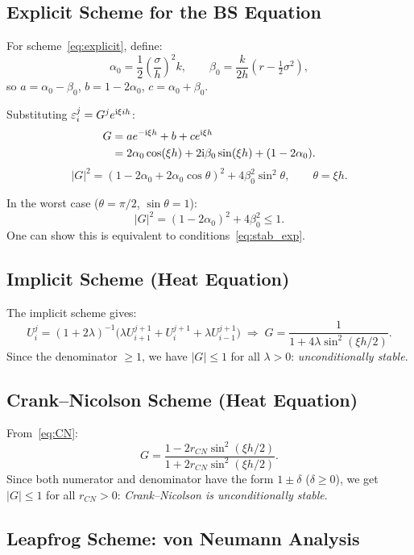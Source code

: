 \documentclass[12pt,a4paper]{article}
\theoremstyle{plain}
\theoremstyle{definition}
\theoremstyle{remark}
\begin{document}
\subsection{Explicit Scheme for the BS Equation}

For scheme~\eqref{eq:explicit}, define:
\[
  \alpha_{0}=\frac{1}{2}\!\left(\frac{\sigma}{h}\right)^{2}k,
  \qquad
  \beta_{0}=\frac{k}{2h}\!\left(r-\tfrac{1}{2}\sigma^{2}\right),
\]
so $a=\alpha_{0}-\beta_{0}$, $b=1-2\alpha_{0}$, $c=\alpha_{0}+\beta_{0}$.

Substituting $\varepsilon_{i}^{j}=G^{j}e^{{\rm i}\xi ih}$:
\begin{align*}
  G &= ae^{-{\rm i}\xi h}+b+ce^{{\rm i}\xi h}\\
    &= 2\alpha_{0}\cos(\xi h)+2{\rm i}\beta_{0}\sin(\xi h)+(1-2\alpha_{0}).
\end{align*}
\[
  |G|^{2}=\left(1-2\alpha_{0}+2\alpha_{0}\cos\theta\right)^{2}
           +4\beta_{0}^{2}\sin^{2}\theta,
  \qquad\theta=\xi h.
\]

In the worst case ($\theta=\pi/2$, $\sin\theta=1$):
\[
  |G|^{2}=(1-2\alpha_{0})^{2}+4\beta_{0}^{2}\leq1.
\]
One can show this is equivalent to conditions~\eqref{eq:stab_exp}.

\subsection{Implicit Scheme (Heat Equation)}

The implicit scheme gives:
\[
  U_{i}^{j}=(1+2\lambda)^{-1}
  \bigl(\lambda U_{i+1}^{j+1}+U_{i}^{j+1}+\lambda U_{i-1}^{j+1}\bigr)
  \;\Longrightarrow\;
  G=\frac{1}{1+4\lambda\sin^{2}(\xi h/2)}.
\]
Since the denominator $\geq1$, we have $|G|\leq1$ for all $\lambda>0$:
\emph{unconditionally stable}.

\subsection{Crank--Nicolson Scheme (Heat Equation)}

From~\eqref{eq:CN}:
\begin{equation}\label{eq:G_CN}
  G=\frac{1-2r_{CN}\sin^{2}(\xi h/2)}{1+2r_{CN}\sin^{2}(\xi h/2)}.
\end{equation}
Since both numerator and denominator have the form $1\pm\delta$
($\delta\geq0$), we get $|G|\leq1$ for all $r_{CN}>0$:
\emph{Crank--Nicolson is unconditionally stable}.

\subsection{Leapfrog Scheme: von Neumann Analysis}
\end{document}
